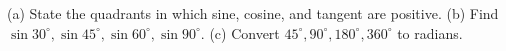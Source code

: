 (a) State the quadrants in which sine, cosine, and tangent are positive. (b) Find $\sin30^\circ,\sin45^\circ,\sin60^\circ,\sin90^\circ$. (c) Convert $45^\circ,90^\circ,180^\circ,360^\circ$ to radians.
